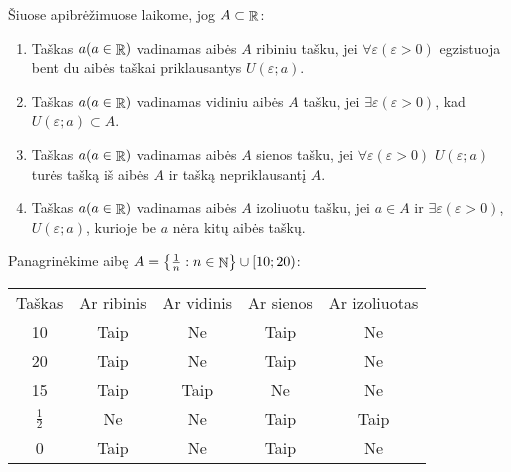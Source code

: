 Šiuose apibrėžimuose laikome, jog $A \subset \mathop{\mathbb{R}}$:
\begin{enumerate}
  \item 
    \begin{defn}
      Taškas $a (a \in \mathop{\mathbb{R}})$ vadinamas aibės $A$ ribiniu tašku, jei 
      $\forall \varepsilon (\varepsilon > 0)$ egzistuoja bent du aibės
      taškai priklausantys $U(\varepsilon; a)$.
    \end{defn}
  \item
    \begin{defn}
      Taškas $a (a \in \mathop{\mathbb{R}})$ vadinamas vidiniu aibės $A$ tašku, jei 
      $\exists \varepsilon (\varepsilon > 0)$, kad 
      $U(\varepsilon; a) \subset A$.
    \end{defn}
  \item 
    \begin{defn}
      Taškas $a (a \in \mathop{\mathbb{R}})$ vadinamas aibės $A$ sienos tašku, jei 
      $\forall \varepsilon (\varepsilon > 0)$ 
      $U(\varepsilon; a)$ turės tašką iš aibės $A$ ir tašką 
      nepriklausantį $A$.
    \end{defn}
  \item 
    \begin{defn}
      Taškas $a (a \in \mathop{\mathbb{R}})$ vadinamas aibės $A$ izoliuotu tašku, jei
      $a \in A$ ir $\exists \varepsilon (\varepsilon > 0)$, 
      $U(\varepsilon; a)$, kurioje be $a$ nėra kitų aibės taškų.
    \end{defn}
\end{enumerate}

\begin{exmp}
  Panagrinėkime aibę $A = \left\{ \frac{1}{n} : n \in \NSET \right\}%
  \cup \left[ 10; 20 \right)$:

  \begin{center}
    \begin{tabular}[]{c c c c c}
      Taškas & Ar ribinis & Ar vidinis & Ar sienos & Ar izoliuotas \\
      10 & Taip & Ne & Taip & Ne \\
      20 & Taip & Ne & Taip & Ne \\
      15 & Taip & Taip & Ne & Ne \\
      $\frac{1}{2}$ & Ne & Ne & Taip & Taip \\
      0 & Taip & Ne & Taip & Ne 
    \end{tabular}
  \end{center}
\end{exmp}

